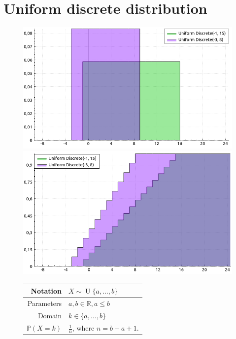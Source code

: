 \documentclass[a4paper,11pt]{article}
\theoremstyle{plain}
\theoremstyle{definition}
\newcommand{\MR}{\mathbb{R}}
\newcommand{\MP}{\mathbb{P}}
\begin{document}
	\section{Uniform discrete distribution}
	\begin{figure}[!htb]\centering
		\begin{minipage}{0.55\textwidth}
			\includegraphics[width=\linewidth, right]{uniform_discrete_pmf}
			\captionsetup{labelformat=empty}
			\includegraphics[width=\linewidth, right]{uniform_discrete_cdf}
			\captionsetup{labelformat=empty}
		\end{minipage}
		\begin{minipage}{0.4\textwidth}
			\begin{tabular}{| r | l |}
				\hline
				Notation & $ X \sim \operatorname{U}\{a, \dots, b\} $ \\
				\hline
				Parameters & $a, b \in \MR, a \leq b$ \\
				\hline
				Domain & $ k \in \{a, \dots, b\} $  \\
				\hline
				$\MP(X = k)$ & $\frac{1}{n} $, where $n=b-a+1$. \\

\end{tabular}
\end{minipage}
\end{figure}
\end{document}
